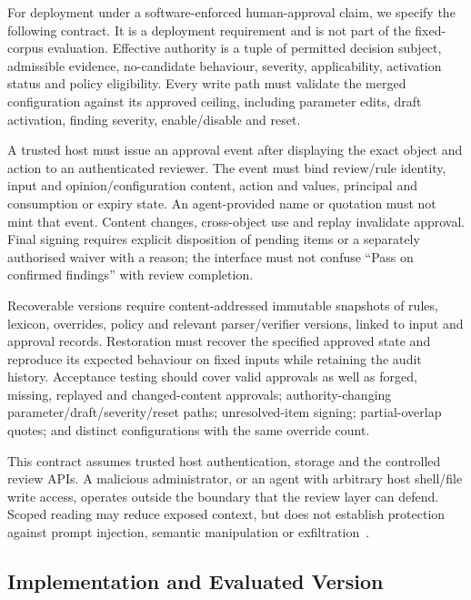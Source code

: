 \documentclass[computers,article,submit,moreauthors]{Definitions/mdpi}
\begin{document}
For deployment under a software-enforced human-approval claim, we specify the following contract. It is a deployment requirement and is not part of the fixed-corpus evaluation. Effective authority is a tuple of permitted decision subject, admissible evidence, no-candidate behaviour, severity, applicability, activation status and policy eligibility. Every write path must validate the merged configuration against its approved ceiling, including parameter edits, draft activation, finding severity, enable/disable and reset.

A trusted host must issue an approval event after displaying the exact object and action to an authenticated reviewer. The event must bind review/rule identity, input and opinion/configuration content, action and values, principal and consumption or expiry state. An agent-provided name or quotation must not mint that event. Content changes, cross-object use and replay invalidate approval. Final signing requires explicit disposition of pending items or a separately authorised waiver with a reason; the interface must not confuse ``Pass on confirmed findings'' with review completion.

Recoverable versions require content-addressed immutable snapshots of rules, lexicon, overrides, policy and relevant parser/verifier versions, linked to input and approval records. Restoration must recover the specified approved state and reproduce its expected behaviour on fixed inputs while retaining the audit history. Acceptance testing should cover valid approvals as well as forged, missing, replayed and changed-content approvals; authority-changing parameter/draft/severity/reset paths; unresolved-item signing; partial-overlap quotes; and distinct configurations with the same override count.

This contract assumes trusted host authentication, storage and the controlled review APIs. A malicious administrator, or an agent with arbitrary host shell/file write access, operates outside the boundary that the review layer can defend. Scoped reading may reduce exposed context, but does not establish protection against prompt injection, semantic manipulation or exfiltration~\cite{shi2024inject,mempriv2025}.

\subsection{Implementation and Evaluated Version}\label{sec:impl}
\end{document}
